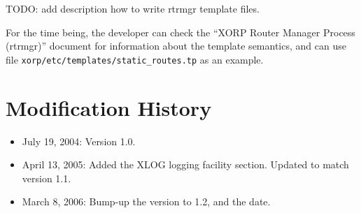 \documentclass[11pt]{article}
\newcommand{\stt}{\tt\small}
\begin{document}
TODO: add description how to write rtrmgr template files.

For the time being, the developer can check the ``XORP Router Manager Process
(rtrmgr)'' document for information about the template semantics, and can use
file {\stt xorp/etc/templates/static\_routes.tp} as an example.

\newpage
\appendix
\section{Modification History}

\begin{itemize}

  \item July 19, 2004: Version 1.0.

  \item April 13, 2005: Added the XLOG logging facility section. Updated
  to match version 1.1.

  \item March 8, 2006: Bump-up the version to 1.2, and the date.

\end{itemize}




\end{document}
